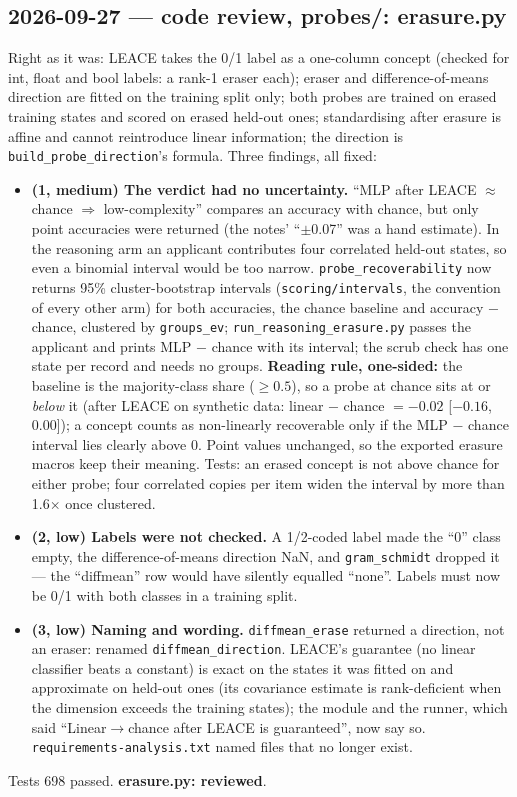 \documentclass{article}
\begin{document}
\subsection*{2026-09-27 --- code review, probes/: erasure.py}
Right as it was: LEACE takes the 0/1 label as a one-column concept (checked for int, float and bool labels: a
rank-1 eraser each); eraser and difference-of-means direction are fitted on the training split only; both
probes are trained on erased training states and scored on erased held-out ones; standardising after erasure
is affine and cannot reintroduce linear information; the direction is \texttt{build\_probe\_direction}'s formula.
Three findings, all fixed:
\begin{itemize}
  \item \textbf{(1, medium) The verdict had no uncertainty.} ``MLP after LEACE $\approx$ chance $\Rightarrow$
        low-complexity'' compares an accuracy with chance, but only point accuracies were returned (the notes'
        ``$\pm$0.07'' was a hand estimate). In the reasoning arm an applicant contributes four correlated held-out
        states, so even a binomial interval would be too narrow. \texttt{probe\_recoverability} now returns 95\%
        cluster-bootstrap intervals (\texttt{scoring/intervals}, the convention of every other arm) for both
        accuracies, the chance baseline and accuracy $-$ chance, clustered by \texttt{groups\_ev};
        \texttt{run\_reasoning\_erasure.py} passes the applicant and prints MLP $-$ chance with its interval;
        the scrub check has one state per record and needs no groups. \textbf{Reading rule, one-sided:} the
        baseline is the majority-class share ($\geq0.5$), so a probe at chance sits at or \emph{below} it (after
        LEACE on synthetic data: linear $-$ chance $=-0.02$ [$-0.16$, 0.00]); a concept counts as non-linearly
        recoverable only if the MLP $-$ chance interval lies clearly above 0. Point values unchanged, so the
        exported erasure macros keep their meaning. Tests: an erased concept is not above chance for either probe;
        four correlated copies per item widen the interval by more than 1.6$\times$ once clustered.
  \item \textbf{(2, low) Labels were not checked.} A 1/2-coded label made the ``0'' class empty, the
        difference-of-means direction NaN, and \texttt{gram\_schmidt} dropped it --- the ``diffmean'' row would have
        silently equalled ``none''. Labels must now be 0/1 with both classes in a training split.
  \item \textbf{(3, low) Naming and wording.} \texttt{diffmean\_erase} returned a direction, not an eraser:
        renamed \texttt{diffmean\_direction}. LEACE's guarantee (no linear classifier beats a constant) is exact
        on the states it was fitted on and approximate on held-out ones (its covariance estimate is
        rank-deficient when the dimension exceeds the training states); the module and the runner, which said
        ``Linear$\to$chance after LEACE is guaranteed'', now say so. \texttt{requirements-analysis.txt} named
        files that no longer exist.
\end{itemize}
Tests 698 passed. \textbf{erasure.py: reviewed}.
\end{document}

